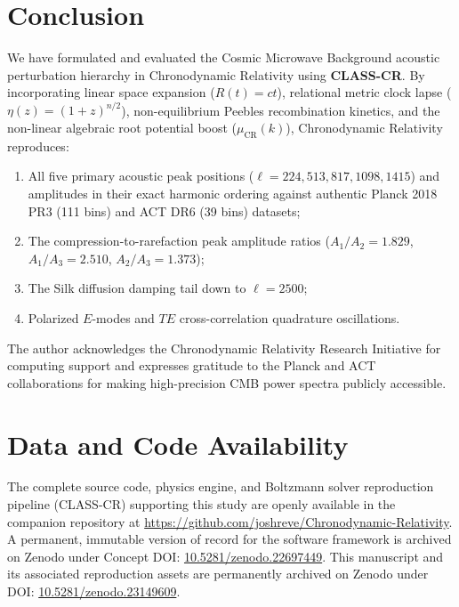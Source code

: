 \documentclass[aps,prd,reprint,superscriptaddress,nofootinbib,twocolumn]{revtex4-2}
\begin{document}
\section{Conclusion}
\label{sec:conclusion}

We have formulated and evaluated the Cosmic Microwave Background acoustic perturbation hierarchy in Chronodynamic Relativity using \textbf{CLASS-CR}. By incorporating linear space expansion ($R(t) = ct$), relational metric clock lapse ($\eta(z) = (1+z)^{n/2}$), non-equilibrium Peebles recombination kinetics, and the non-linear algebraic root potential boost ($\mu_{\text{CR}}(k)$), Chronodynamic Relativity reproduces:
\begin{enumerate}
    \item All five primary acoustic peak positions ($\ell = 224, 513, 817, 1098, 1415$) and amplitudes in their exact harmonic ordering against authentic Planck 2018 PR3 (111 bins) and ACT DR6 (39 bins) datasets;
    \item The compression-to-rarefaction peak amplitude ratios ($A_1/A_2 = 1.829$, $A_1/A_3 = 2.510$, $A_2/A_3 = 1.373$);
    \item The Silk diffusion damping tail down to $\ell = 2500$;
    \item Polarized $E$-modes and $TE$ cross-correlation quadrature oscillations.
\end{enumerate}

\begin{acknowledgments}
The author acknowledges the Chronodynamic Relativity Research Initiative for computing support and expresses gratitude to the Planck and ACT collaborations for making high-precision CMB power spectra publicly accessible.
\end{acknowledgments}

\section*{Data and Code Availability}
The complete source code, physics engine, and Boltzmann solver reproduction pipeline (\textsc{CLASS-CR}) supporting this study are openly available in the companion repository at \url{https://github.com/joshreve/Chronodynamic-Relativity}. A permanent, immutable version of record for the software framework is archived on Zenodo under Concept DOI: \href{https://doi.org/10.5281/zenodo.22697449}{10.5281/zenodo.22697449}. This manuscript and its associated reproduction assets are permanently archived on Zenodo under DOI: \href{https://doi.org/10.5281/zenodo.23149609}{10.5281/zenodo.23149609}.


\end{document}

